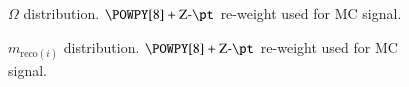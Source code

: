 \begin{figure}[h!tbp]
	\centering
	\hfill
	\caption{$\Omega$ distribution. $\POWPY[8]+\text{Z-}\pt$ re-weight used for MC signal.}
	\label{AFig2P}
\end{figure} 

\begin{figure}[h!tbp]
	\centering
	\hfill
	\caption{$m_{\text{reco}(i)}$ distribution. $\POWPY[8]+\text{Z-}\pt$ re-weight used for MC signal.}
	\label{AFig3P}
\end{figure} 

